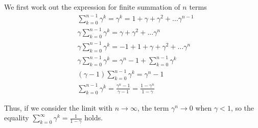 \documentclass{exam}
\begin{document}
\begin{problem}
\begin{enumerate}
\begin{enumerate}[(a)]
          \begin{solutionorlines}[2in]
    We first work out the expression for finite summation of $n$ terms
    \begin{align*}
    	&\sum_{k=0}^{n-1} \gamma^k = \gamma^k = 1 + \gamma + \gamma^2 + ... \gamma^{n-1} \\
    	& \gamma \sum_{k=0}^{n-1} \gamma^k =  \gamma + \gamma^2 + ... \gamma^{n} \\
    	& \gamma \sum_{k=0}^{n-1} \gamma^k = -1 + 1 + \gamma + \gamma^2 + ... \gamma^{n} \\
    	& \gamma \sum_{k=0}^{n-1} \gamma^k = \gamma^n - 1 + \sum_{k=0}^{n-1} \gamma^k \\
    	& (\gamma - 1) \sum_{k=0}^{n-1} \gamma^k = \gamma^n - 1 \\
    	& \sum_{k=0}^{n-1} \gamma^k = \frac{\gamma^n - 1}{\gamma - 1} =  \frac{1 - \gamma^n}{1 - \gamma}
    \end{align*}
    
    Thus, if we consider the limit with $n \rightarrow \infty$, the term $\gamma^n \rightarrow 0$ when $\gamma < 1$, so the equality $\sum_{k=0}^{\infty} \gamma^k = \frac{1}{1 - \gamma}$ holds.
        \end{solutionorlines}


\end{enumerate}
\end{enumerate}
\end{problem}
\end{document}
